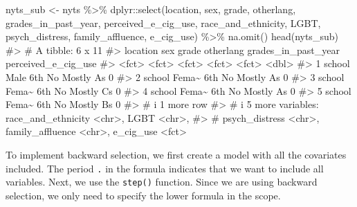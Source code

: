 \documentclass[
  letterpaper,
]{krantz}
\makeatletter
\newenvironment{Shaded}{\begin{snugshade}}{\end{snugshade}}
\newcommand{\CommentTok}[1]{\textcolor[rgb]{0.37,0.37,0.37}{#1}}
\newcommand{\FunctionTok}[1]{\textcolor[rgb]{0.28,0.35,0.67}{#1}}
\newcommand{\NormalTok}[1]{\textcolor[rgb]{0.00,0.23,0.31}{#1}}
\newcommand{\OtherTok}[1]{\textcolor[rgb]{0.00,0.23,0.31}{#1}}
\newcommand{\SpecialCharTok}[1]{\textcolor[rgb]{0.37,0.37,0.37}{#1}}
\newenvironment{kframe}{%
\medskip{}
\setlength{\fboxsep}{.8em}
 \def\at@end@of@kframe{}%
 \ifinner\ifhmode%
  \def\at@end@of@kframe{\end{minipage}}%
  \begin{minipage}{\columnwidth}%
 \fi\fi%
 \def\FrameCommand##1{\hskip\@totalleftmargin \hskip-\fboxsep
 \colorbox{shadecolor}{##1}\hskip-\fboxsep
     \hskip-\linewidth \hskip-\@totalleftmargin \hskip\columnwidth}%
 \MakeFramed {\advance\hsize-\width
   \@totalleftmargin\z@ \linewidth\hsize
   \@setminipage}}%
 {\par\unskip\endMakeFramed%
 \at@end@of@kframe}
\renewenvironment{Shaded}{\begin{kframe}}{\end{kframe}}
\makeatother
\begin{document}
\begin{Shaded}
\begin{Highlighting}[]
\NormalTok{nyts\_sub }\OtherTok{\textless{}{-}}\NormalTok{ nyts }\SpecialCharTok{\%\textgreater{}\%} 
\NormalTok{  dplyr}\SpecialCharTok{::}\FunctionTok{select}\NormalTok{(location, sex, grade, otherlang, grades\_in\_past\_year, }
\NormalTok{                perceived\_e\_cig\_use, race\_and\_ethnicity, LGBT, }
\NormalTok{                psych\_distress, family\_affluence, e\_cig\_use) }\SpecialCharTok{\%\textgreater{}\%}
  \FunctionTok{na.omit}\NormalTok{()}
\FunctionTok{head}\NormalTok{(nyts\_sub)}
\CommentTok{\#\textgreater{} \# A tibble: 6 x 11}
\CommentTok{\#\textgreater{}   location sex   grade otherlang grades\_in\_past\_year perceived\_e\_cig\_use}
\CommentTok{\#\textgreater{}   \textless{}fct\textgreater{}    \textless{}fct\textgreater{} \textless{}fct\textgreater{} \textless{}fct\textgreater{}     \textless{}fct\textgreater{}                             \textless{}dbl\textgreater{}}
\CommentTok{\#\textgreater{} 1 school   Male  6th   No        Mostly A\textquotesingle{}s                            0}
\CommentTok{\#\textgreater{} 2 school   Fema\textasciitilde{} 6th   No        Mostly A\textquotesingle{}s                            0}
\CommentTok{\#\textgreater{} 3 school   Fema\textasciitilde{} 6th   No        Mostly C\textquotesingle{}s                            0}
\CommentTok{\#\textgreater{} 4 school   Fema\textasciitilde{} 6th   No        Mostly A\textquotesingle{}s                            0}
\CommentTok{\#\textgreater{} 5 school   Fema\textasciitilde{} 6th   No        Mostly B\textquotesingle{}s                            0}
\CommentTok{\#\textgreater{} \# i 1 more row}
\CommentTok{\#\textgreater{} \# i 5 more variables: race\_and\_ethnicity \textless{}chr\textgreater{}, LGBT \textless{}chr\textgreater{},}
\CommentTok{\#\textgreater{} \#   psych\_distress \textless{}chr\textgreater{}, family\_affluence \textless{}chr\textgreater{}, e\_cig\_use \textless{}fct\textgreater{}}
\end{Highlighting}
\end{Shaded}

To implement backward selection, we first create a model with all the
covariates included. The period \texttt{.} in the formula indicates that
we want to include all variables. Next, we use the \texttt{step()}
function. Since we are using backward selection, we only need to specify
the lower formula in the scope.
\end{document}
